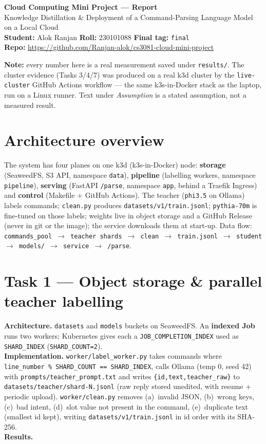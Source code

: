 \documentclass[10pt,a4paper]{article}
\newcommand{\code}[1]{\texttt{\small #1}}
\begin{document}
\begin{center}
  {\LARGE\bfseries Cloud Computing Mini Project --- Report}\\[2pt]
  {\normalsize Knowledge Distillation \& Deployment of a Command-Parsing Language Model on a Local Cloud}\\[6pt]
  \textbf{Student:} Alok Ranjan \quad\textbf{Roll:} 230101088 \quad\textbf{Final tag:} \code{final}\\[2pt]
  \textbf{Repo:} \url{https://github.com/Ranjan-alok/cs3081-cloud-mini-project}
\end{center}

\noindent\colorbox{gray!12}{\parbox{\dimexpr\textwidth-2\fboxsep\relax}{\small
\textbf{Note:} every number here is a real measurement saved under \code{results/}. The cluster evidence
(Tasks 3/4/7) was produced on a real k3d cluster by the \code{live-cluster} GitHub Actions workflow --- the
same k3s-in-Docker stack as the laptop, run on a Linux runner. Text under \textit{Assumption} is a stated
assumption, not a measured result.}}

\section{Architecture overview}
The system has four planes on one k3d (k3s-in-Docker) node: \textbf{storage} (SeaweedFS, S3 API, namespace
\code{data}), \textbf{pipeline} (labelling workers, namespace \code{pipeline}), \textbf{serving} (FastAPI
\code{/parse}, namespace \code{app}, behind a Traefik Ingress) and \textbf{control} (Makefile + GitHub
Actions). The teacher (\code{phi3.5} on Ollama) labels commands; \code{clean.py} produces
\code{datasets/v1/train.jsonl}; \code{pythia-70m} is fine-tuned on those labels; weights live in object
storage and a GitHub Release (never in git or the image); the service downloads them at start-up. Data flow:
\code{commands\_pool $\rightarrow$ teacher shards $\rightarrow$ clean $\rightarrow$ train.jsonl $\rightarrow$
student $\rightarrow$ models/ $\rightarrow$ service $\rightarrow$ /parse}.

\section{Task 1 --- Object storage \& parallel teacher labelling}
\textbf{Architecture.} \code{datasets} and \code{models} buckets on SeaweedFS. An \textbf{indexed Job} runs
two workers; Kubernetes gives each a \code{JOB\_COMPLETION\_INDEX} used as \code{SHARD\_INDEX}
(\code{SHARD\_COUNT=2}).\\
\textbf{Implementation.} \code{worker/label\_worker.py} takes commands where
\code{line\_number \% SHARD\_COUNT == SHARD\_INDEX}, calls Ollama (temp 0, seed 42) with
\code{prompts/teacher\_prompt.txt} and writes \code{\{id,text,teacher\_raw\}} to
\code{datasets/teacher/shard-N.jsonl} (raw reply stored unedited, with resume + periodic upload).
\code{worker/clean.py} removes (a)~invalid JSON, (b)~wrong keys, (c)~bad intent, (d)~slot value not present
in the command, (e)~duplicate text (smallest id kept), writing \code{datasets/v1/train.jsonl} in id order
with its SHA-256.\\
\textbf{Results.}
\end{document}
